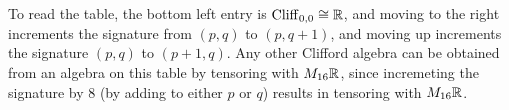 $ $\\\\\\
To read the table, the bottom left entry is $\operatorname{Cliff}_{0,0} \cong \mathbb{R}$, and moving to
the right increments the signature from $(p,q)$ to $(p,q+1)$, and moving up
increments the signature $(p,q)$ to $(p+1,q)$. Any other Clifford algebra
can be obtained from an algebra on this table by tensoring with $M_{16}\mathbb{R}$, since
incremeting the signature by $8$ (by adding to either $p$ or $q$) results in
tensoring with $M_{16}\mathbb{R}$.
%
